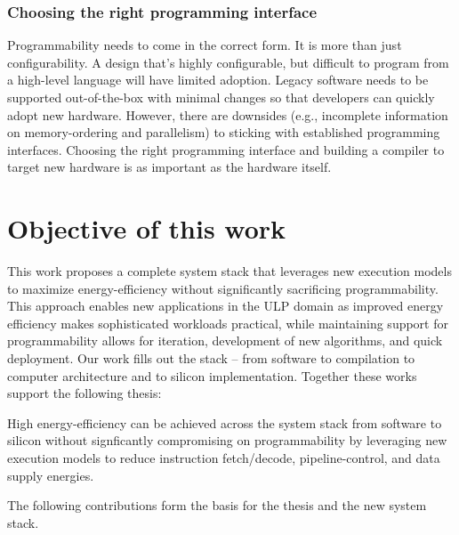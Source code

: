 \subsubsection{Choosing the right programming interface}
Programmability needs to come in the correct form.
% 
It is more than just configurability.
% 
A design that's highly configurable, but difficult to program from a high-level language will have limited adoption.
% 
Legacy software needs to be supported out-of-the-box with minimal changes so that developers can quickly adopt new hardware.
% 
However, there are downsides (e.g., incomplete information on memory-ordering and parallelism) to sticking with established programming interfaces.
% 
Choosing the right programming interface and building a compiler to target new hardware is as important as the hardware itself.


\figOverview

\section{Objective of this work}

This work proposes a complete system stack that leverages new execution models to maximize energy-efficiency without significantly sacrificing programmability.
% 
This approach enables new applications in the ULP domain as improved energy efficiency makes sophisticated workloads practical, while maintaining support for programmability allows for iteration, development of new algorithms, and quick deployment. 
% 
Our work fills out the stack -- from software to compilation to computer architecture and to silicon implementation.
% 
Together these works support the following thesis:

\begin{adjustwidth}{1cm}{1cm}
High energy-efficiency can be achieved 
across the system stack from software to silicon without signficantly compromising on programmability by leveraging new execution models to reduce instruction fetch/decode, pipeline-control, and data supply energies.
% 

\end{adjustwidth}
% 
The following contributions form the basis for the thesis and the new system stack.

